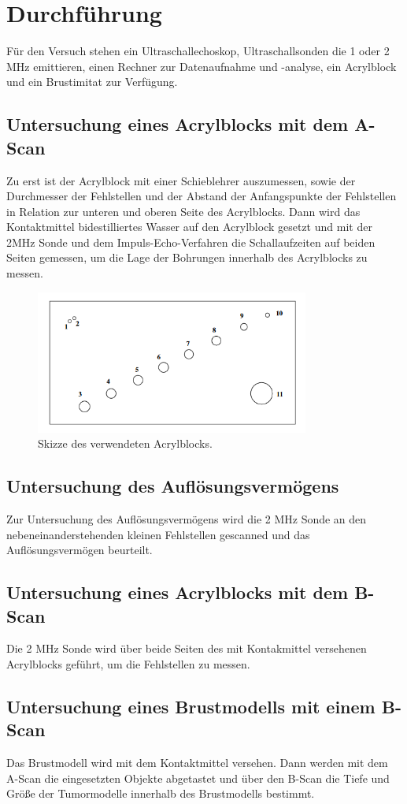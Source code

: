 \section{Durchführung}
\label{sec:Durchführung}
Für den Versuch stehen ein Ultraschallechoskop, Ultraschallsonden die 1 oder 2 MHz emittieren, einen Rechner zur Datenaufnahme und -analyse, ein Acrylblock und ein Brustimitat zur Verfügung.

\subsection{Untersuchung eines Acrylblocks mit dem A-Scan}
Zu erst ist der Acrylblock mit einer Schieblehrer auszumessen, sowie der Durchmesser der Fehlstellen und der Abstand der Anfangspunkte der Fehlstellen in Relation zur unteren und oberen Seite des Acrylblocks.
Dann wird das Kontaktmittel bidestilliertes Wasser auf den Acrylblock gesetzt und mit der 2MHz Sonde und dem Impuls-Echo-Verfahren die Schallaufzeiten auf beiden Seiten gemessen, um die Lage der Bohrungen innerhalb des Acrylblocks zu messen.  
\begin{figure}[H]
  \centering
  \includegraphics[width=9cm]{block}
  \caption{Skizze des verwendeten Acrylblocks.}
\end{figure}

\subsection{Untersuchung des Auflösungsvermögens}
Zur Untersuchung des Auflösungsvermögens wird die 2 MHz Sonde an den nebeneinanderstehenden kleinen Fehlstellen gescanned und das Auflösungsvermögen beurteilt.

\subsection{Untersuchung eines Acrylblocks mit dem B-Scan}
Die 2 MHz Sonde wird über beide Seiten des mit Kontakmittel versehenen Acrylblocks geführt, um die Fehlstellen zu messen. 

\subsection{Untersuchung eines Brustmodells mit einem B-Scan}
Das Brustmodell wird mit dem Kontaktmittel versehen. Dann werden mit dem A-Scan die eingesetzten Objekte abgetastet und über den B-Scan die Tiefe und Größe der Tumormodelle innerhalb des Brustmodells bestimmt.

